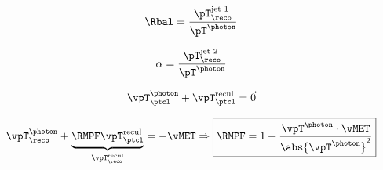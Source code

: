 \begin{frame}[t]
\vspace{\baselineskip}

~\hfill

\hfill~

\pause
\vfill

~\hfill

\hfill\hfill\hfill

\hfill\hfill\hfill

\hfill\hfill\hfill

\hfill~

\end{frame}

\begin{frame}
\begin{minipage}[t]{.45\textwidth}
\begin{equation*}
\Rbal = \frac{\pT_\reco^\text{jet 1}}{\pT^{\photon}}
\end{equation*}
\end{minipage}
\hfill
\begin{minipage}[t]{.45\textwidth}
\begin{equation*}
\alpha = \frac{\pT_\reco^\text{jet 2}}{\pT^{\photon}}
\end{equation*}
\end{minipage}
\end{frame}

\begin{frame}

\begin{equation*}
\vpT^\photon_\ptcl + \vpT^\text{recul}_\ptcl = \vec{0}
\end{equation*}

\pause
\vfill


\begin{equation*}
\vpT^\photon_\reco + \underbrace{\RMPF \vpT^\text{recul}_\ptcl}_{\vpT^\text{recul}_\reco} = -\vMET
\Rightarrow
\boxed{\RMPF = 1 + \frac{\vpT^\photon\cdot\vMET}{\abs{\vpT^\photon}^2}}
\end{equation*}
\end{frame}